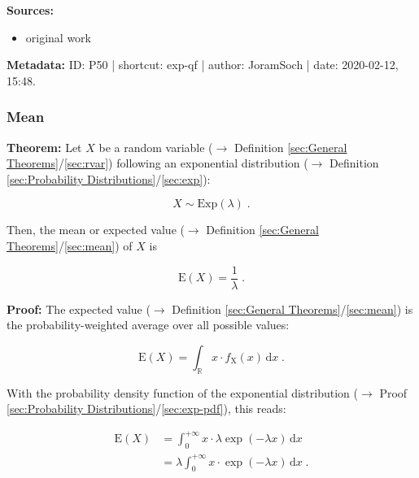 \documentclass[a4paper,12pt,twoside]{book}
\begin{document}
\vspace{1em}
\textbf{Sources:}
\begin{itemize}
\item original work\end{itemize}


\vspace{1em}
\textbf{Metadata:} ID: P50 | shortcut: exp-qf | author: JoramSoch | date: 2020-02-12, 15:48.
\vspace{1em}



\subsubsection[\textbf{Mean}]{Mean} \label{sec:exp-mean}
\setcounter{equation}{0}

\textbf{Theorem:} Let $X$ be a random variable ($\rightarrow$ Definition \ref{sec:General Theorems}/\ref{sec:rvar}) following an exponential distribution ($\rightarrow$ Definition \ref{sec:Probability Distributions}/\ref{sec:exp}):

\begin{equation} \label{eq:exp-mean-exp}
X \sim \mathrm{Exp}(\lambda) \; .
\end{equation}

Then, the mean or expected value ($\rightarrow$ Definition \ref{sec:General Theorems}/\ref{sec:mean}) of $X$ is

\begin{equation} \label{eq:exp-mean-exp-mean}
\mathrm{E}(X) = \frac{1}{\lambda} \; .
\end{equation}


\vspace{1em}
\textbf{Proof:} The expected value ($\rightarrow$ Definition \ref{sec:General Theorems}/\ref{sec:mean}) is the probability-weighted average over all possible values:

\begin{equation} \label{eq:exp-mean-mean}
\mathrm{E}(X) = \int_{\mathbb{R}} x \cdot f_\mathrm{X}(x) \, \mathrm{d}x \; .
\end{equation}

With the probability density function of the exponential distribution ($\rightarrow$ Proof \ref{sec:Probability Distributions}/\ref{sec:exp-pdf}), this reads:

\begin{equation} \label{eq:exp-mean-exp-mean-s1}
\begin{split}
\mathrm{E}(X) &= \int_{0}^{+\infty} x \cdot \lambda \exp(-\lambda x) \, \mathrm{d}x \\
&= \lambda \int_{0}^{+\infty} x \cdot \exp(-\lambda x) \, \mathrm{d}x \; .
\end{split}
\end{equation}
\end{document}
